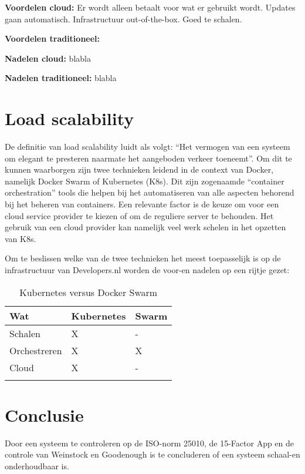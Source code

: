 \textbf{Voordelen cloud:} Er wordt alleen betaalt voor wat er gebruikt wordt. Updates gaan automatisch. Infrastructuur out-of-the-box. Goed te schalen.

\textbf{Voordelen traditioneel:} 

\textbf{Nadelen cloud:} blabla

\textbf{Nadelen traditioneel:} blabla


\section{Load scalability}

De definitie van load scalability luidt als volgt: \enquote{Het vermogen van een systeem om elegant te presteren naarmate het aangeboden verkeer toeneemt}. Om dit te kunnen waarborgen zijn twee technieken leidend in de context van Docker, namelijk Docker Swarm of Kubernetes (K8s). Dit zijn zogenaamde \enquote{container orchestration} tools die helpen bij het automatiseren van alle aspecten behorend bij het beheren van containers. Een relevante factor is de keuze om voor een cloud service provider te kiezen of om de reguliere server te behouden. Het gebruik van een cloud provider kan namelijk veel werk schelen in het opzetten van K8s.

Om te beslissen welke van de twee technieken het meest toepasselijk is op de infrastructuur van Developers.nl worden de voor-en nadelen op een rijtje gezet:

\begin{table}[h]
	\caption{Kubernetes versus Docker Swarm}
	\label{tab:LoadScalability}
	\centering
	\begin{tabular}{p{2cm} p{3.5cm} p{3.5cm}}
		\toprule
		\textbf{Wat} & \textbf{Kubernetes} & \textbf{Swarm} \\
		\midrule
		Schalen & X & - \\
		Orchestreren & X & X \\
		Cloud & X & - \\
		\bottomrule\\
	\end{tabular}
\end{table}



\section{Conclusie}

Door een systeem te controleren op de ISO-norm 25010, de 15-Factor App en de controle van Weinstock en Goodenough is te concluderen of een systeem schaal-en onderhoudbaar is.